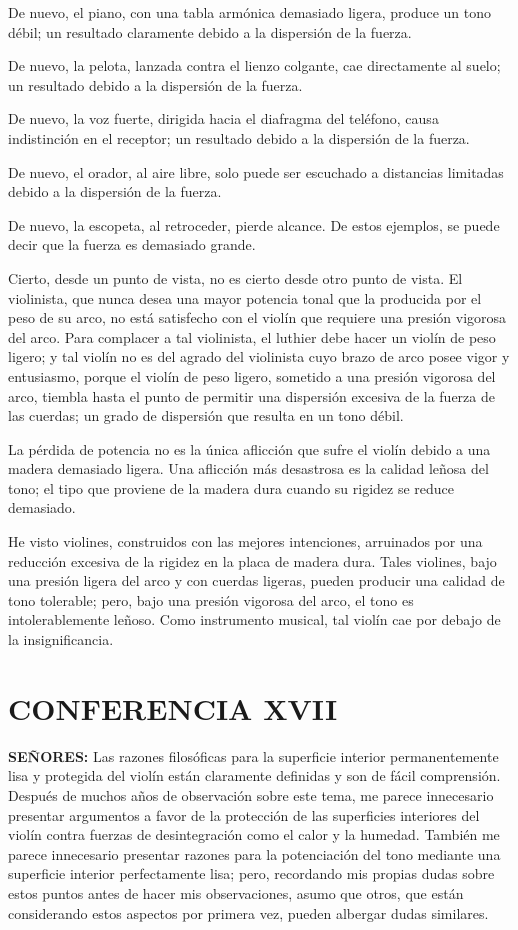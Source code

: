 \documentclass[12pt]{book}
\begin{document}
De nuevo, el piano, con una tabla armónica demasiado ligera, produce un tono débil; un resultado claramente debido a la dispersión de la fuerza.

De nuevo, la pelota, lanzada contra el lienzo colgante, cae directamente al suelo; un resultado debido a la dispersión de la fuerza.

De nuevo, la voz fuerte, dirigida hacia el diafragma del teléfono, causa indistinción en el receptor; un resultado debido a la dispersión de la fuerza.

De nuevo, el orador, al aire libre, solo puede ser escuchado a distancias limitadas debido a la dispersión de la fuerza.

De nuevo, la escopeta, al retroceder, pierde alcance. De estos ejemplos, se puede decir que la fuerza es demasiado grande.

Cierto, desde un punto de vista, no es cierto desde otro punto de vista. El violinista, que nunca desea una mayor potencia tonal que la producida por el peso de su arco, no está satisfecho con el violín que requiere una presión vigorosa del arco. Para complacer a tal violinista, el luthier debe hacer un violín de peso ligero; y tal violín no es del agrado del violinista cuyo brazo de arco posee vigor y entusiasmo, porque el violín de peso ligero, sometido a una presión vigorosa del arco, tiembla hasta el punto de permitir una dispersión excesiva de la fuerza de las cuerdas; un grado de dispersión que resulta en un tono débil.

La pérdida de potencia no es la única aflicción que sufre el violín debido a una madera demasiado ligera. Una aflicción más desastrosa es la calidad leñosa del tono; el tipo que proviene de la madera dura cuando su rigidez se reduce demasiado.

He visto violines, construidos con las mejores intenciones, arruinados por una reducción excesiva de la rigidez en la placa de madera dura. Tales violines, bajo una presión ligera del arco y con cuerdas ligeras, pueden producir una calidad de tono tolerable; pero, bajo una presión vigorosa del arco, el tono es intolerablemente leñoso. Como instrumento musical, tal violín cae por debajo de la insignificancia.

\section*{CONFERENCIA XVII}

\textbf{SEÑORES:} Las razones filosóficas para la superficie interior permanentemente lisa y protegida del violín están claramente definidas y son de fácil comprensión. Después de muchos años de observación sobre este tema, me parece innecesario presentar argumentos a favor de la protección de las superficies interiores del violín contra fuerzas de desintegración como el calor y la humedad. También me parece innecesario presentar razones para la potenciación del tono mediante una superficie interior perfectamente lisa; pero, recordando mis propias dudas sobre estos puntos antes de hacer mis observaciones, asumo que otros, que están considerando estos aspectos por primera vez, pueden albergar dudas similares.
\end{document}

